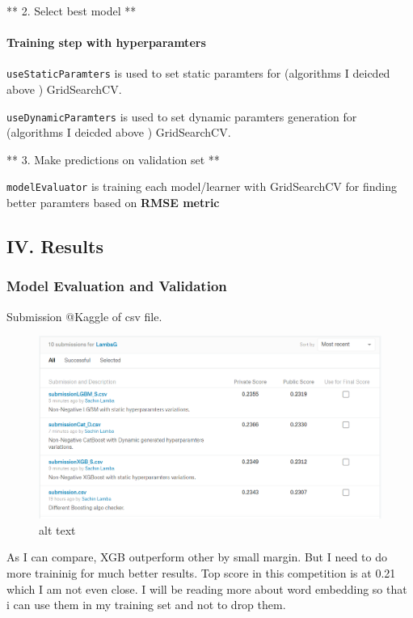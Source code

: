 \documentclass[11pt]{article}
\makeatletter
\def\maxwidth{\ifdim\Gin@nat@width>\linewidth\linewidth
    \else\Gin@nat@width\fi}
\let\Oldincludegraphics\includegraphics
\renewcommand{\includegraphics}[1]{\Oldincludegraphics[width=.8\maxwidth]{#1}}
\makeatother
\begin{document}
    ** 2. Select best model **

    \hypertarget{training-step-with-hyperparamters}{%
\paragraph{Training step with
hyperparamters}\label{training-step-with-hyperparamters}}

\texttt{useStaticParamters} is used to set static paramters for
(algorithms I deicded above ) GridSearchCV.

\texttt{useDynamicParamters} is used to set dynamic paramters generation
for (algorithms I deicded above ) GridSearchCV.

    ** 3. Make predictions on validation set **

    \texttt{modelEvaluator} is training each model/learner with GridSearchCV
for finding better paramters based on \textbf{RMSE metric}

    \hypertarget{iv.-results}{%
\subsection{IV. Results}\label{iv.-results}}

    \hypertarget{model-evaluation-and-validation}{%
\subsubsection{Model Evaluation and
Validation}\label{model-evaluation-and-validation}}

    Submission @Kaggle of csv file.

\begin{figure}
\centering
\includegraphics{./submissions.png}
\caption{alt text}
\end{figure}

    As I can compare, XGB outperform other by small margin. But I need to do
more traininig for much better results. Top score in this competition is
at 0.21 which I am not even close. I will be reading more about word
embedding so that i can use them in my training set and not to drop
them.
\end{document}
